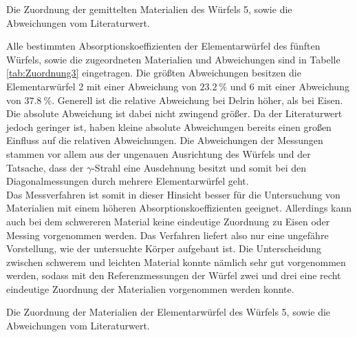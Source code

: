 \begin{table}
	\centering
	\caption{Die Zuordnung der gemittelten Materialien des Würfels 5, sowie die Abweichungen vom Literaturwert.}
	
	\label{tab:Zuordnung2}
\end{table}

\newpage
\noindent Alle bestimmten Absorptionskoeffizienten der Elementarwürfel des fünften Würfels, sowie die zugeordneten Materialien und Abweichungen sind in Tabelle \ref{tab:Zuordnung3} eingetragen. Die größten Abweichungen besitzen die Elementarwürfel 2 mit einer Abweichung von $\SI{23.2}{\%}$ und 6 mit einer Abweichung von $\SI{37.8}{\%}$. Generell ist die relative Abweichung bei Delrin höher, als bei Eisen. Die absolute Abweichung ist dabei nicht zwingend größer. Da der Literaturwert jedoch geringer ist, haben kleine absolute Abweichungen bereits einen großen Einfluss auf die relativen Abweichungen. Die Abweichungen der Messungen stammen vor allem aus der ungenauen Ausrichtung des Würfels und der Tatsache, dass der $\gamma$-Strahl eine Ausdehnung besitzt und somit bei den Diagonalmessungen durch mehrere Elementarwürfel geht.\\
Das Messverfahren ist somit in dieser Hinsicht besser für die Untersuchung von Materialien mit einem höheren Absorptionskoeffizienten geeignet. Allerdings kann auch bei dem schwereren Material keine eindeutige Zuordnung zu Eisen oder Messing vorgenommen werden. Das Verfahren liefert also nur eine ungefähre Vorstellung, wie der untersuchte Körper aufgebaut ist. Die Unterscheidung zwischen schwerem und leichten Material konnte nämlich sehr gut vorgenommen werden, sodass mit den Referenzmessungen der Würfel zwei und drei eine recht eindeutige Zuordnung der Materialien vorgenommen werden konnte.        

\begin{table}
	\centering
	\caption{Die Zuordnung der Materialien der Elementarwürfel des Würfels 5, sowie die Abweichungen vom Literaturwert.}
	
	\label{tab:Zuordnung3}
\end{table}
